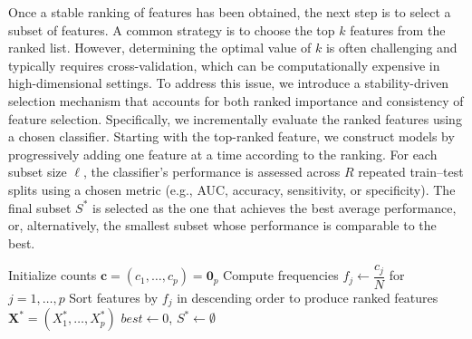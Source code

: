 \documentclass[twoside]{article}
\begin{document}
Once a stable ranking of features has been obtained, the next step is to select a subset of features. A common strategy is to choose the top $k$ features from the ranked list. However, determining the optimal value of $k$ is often challenging and typically requires cross-validation, which can be computationally expensive in high-dimensional settings. To address this issue, we introduce a stability-driven selection mechanism that accounts for both ranked importance and consistency of feature selection. Specifically, we incrementally evaluate the ranked features using a chosen classifier. Starting with the top-ranked feature, we construct models by progressively adding one feature at a time according to the ranking. For each subset size $\ell$, the classifier's performance is assessed across $R$ repeated train--test splits using a chosen metric (e.g., AUC, accuracy, sensitivity, or specificity). The final subset $S^{*}$ is selected as the one that achieves the best average performance, or, alternatively, the smallest subset whose performance is comparable to the best.
 
\begin{algorithm}[h!]
	\caption{Integrated Stability-Ranked Feature Selection(ISRS)}
	\label{Alg1}
	\BlankLine
	Initialize counts $\mathbf{c}=(c_1,\dots, c_p)= \mathbf{0}_p$\;
	Compute frequencies $f_j \leftarrow \dfrac{c_j}{N} $ for $j=1,\dots,p$\;
	Sort features by $f_j$ in descending order to produce ranked features  $\textbf{X}^{*}=(X_{1}^{*},\dots,X_{p}^{*})$\;
	\BlankLine
	$best \leftarrow 0$, $S^* \leftarrow \emptyset$\;
\end{algorithm}
\end{document}
